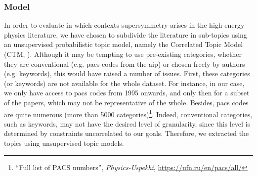 \documentclass[smallextended]{svjour3}
\begin{document}
\subsubsection{Model}

In order to evaluate in which contexts supersymmetry arises in the high-energy physics literature, we have chosen to subdivide the literature in sub-topics using an unsupervised probabilistic topic model, namely the Correlated Topic Model (CTM, \citealt{Blei2007}). Although it may be tempting to use pre-existing categories, whether they are conventional (e.g. \gls{pacs} codes from the \gls{aip}) or chosen freely by authors (e.g. keywords), this would have raised a number of issues. First, these categories (or keywords) are not available for the whole dataset. For instance, in our case, we only have access to \gls{pacs} codes from 1995 onwards, and only then for a subset of the papers, which may not be representative of the whole. Besides, \gls{pacs} codes are quite numerous (more than 5000 categories)\footnote{``Full list of PACS numbers'', \textit{
Physics-Uspekhi}, \url{https://ufn.ru/en/pacs/all/}}. Indeed, conventional categories, such as keywords, may not have the desired level of granularity, since this level is determined by constraints uncorrelated to our goals. Therefore, we extracted the topics using unsupervised topic models. %
\end{document}
